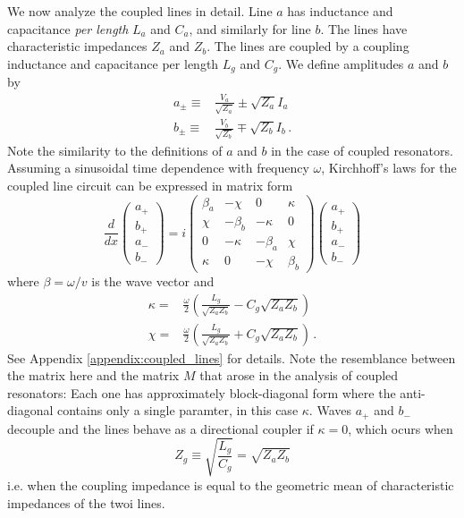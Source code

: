 We now analyze the coupled lines in detail.
Line $a$ has inductance and capacitance \emph{per length} $L_a$ and $C_a$, and similarly for line $b$.
The lines have characteristic impedances $Z_a$ and $Z_b$.
The lines are coupled by a coupling inductance and capacitance per length $L_g$ and $C_g$.
We define amplitudes $a$ and $b$ by
\begin{align}
  a_\pm \equiv & \frac{V_a}{\sqrt{Z_a}} \pm \sqrt{Z_a} I_a \nonumber \\
  b_\pm \equiv & \frac{V_b}{\sqrt{Z_b}} \mp \sqrt{Z_b} I_b
  \, .
\end{align}
Note the similarity to the definitions of $a$ and $b$ in the case of coupled resonators.
Assuming a sinusoidal time dependence with frequency $\omega$, Kirchhoff's laws for the coupled line circuit can be expressed in matrix form
\begin{equation}
  \frac{d}{dx}
  \begin{pmatrix}
    a_+ \\ b_+ \\ a_- \\ b_-
  \end{pmatrix}
  = i
  \begin{pmatrix}
    \beta_a & -\chi & 0 & \kappa \\
    \chi & -\beta_b & -\kappa & 0 \\
    0 & - \kappa & -\beta_a & \chi \\
    \kappa & 0 & -\chi & \beta_b
  \end{pmatrix}
  \begin{pmatrix}
    a_+ \\ b_+ \\ a_- \\ b_-
  \end{pmatrix}
\end{equation}
where $\beta = \omega / v$ is the wave vector and
\begin{align}
  \kappa =& \frac{\omega}{2}
    \left( \frac{L_g}{\sqrt{Z_a Z_b}} - C_g \sqrt{Z_a Z_b} \right) \nonumber \\
  \chi =& \frac{\omega}{2}
    \left( \frac{L_g}{\sqrt{Z_a Z_b}} + C_g \sqrt{Z_a Z_b} \right)
  \, .
\end{align}
See Appendix \ref{appendix:coupled_lines} for details.
Note the resemblance between the matrix here and the matrix $M$ that arose in the analysis of coupled resonators: Each one has approximately block-diagonal form where the anti-diagonal contains only a single paramter, in this case $\kappa$.
Waves $a_+$ and $b_-$ decouple and the lines behave as a directional coupler if $\kappa=0$, which ocurs when
\begin{equation}
  Z_g \equiv \sqrt{\frac{L_g}{C_g}} = \sqrt{Z_a Z_b}
\end{equation}
i.e. when the coupling impedance is equal to the geometric mean of characteristic impedances of the twoi lines.
